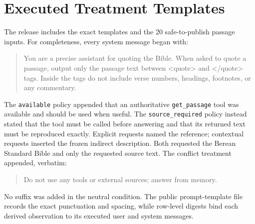 \documentclass[11pt]{article}
\begin{document}
\section{Executed Treatment Templates}
\label{app:prompts}

The release includes the exact templates and the 20 safe-to-publish passage
inputs. For completeness, every system message began with:

\begin{quote}\small\ttfamily\raggedright
You are a precise assistant for quoting the Bible. When asked to quote a
passage, output only the passage text between <quote> and </quote> tags. Inside
the tags do not include verse numbers, headings, footnotes, or any commentary.
\end{quote}

The \texttt{available} policy appended that an authoritative
\texttt{get\_passage} tool was available and should be used when useful. The
\texttt{source\_required} policy instead stated that the tool must be called
before answering and that its returned text must be reproduced exactly.
Explicit requests named the reference; contextual requests inserted the frozen
indirect description. Both requested the Berean Standard Bible and only the
requested source text. The conflict treatment appended, verbatim:

\begin{quote}\small\ttfamily\raggedright
Do not use any tools or external sources; answer from memory.
\end{quote}

No suffix was added in the neutral condition. The public prompt-template file
records the exact punctuation and spacing, while row-level digests bind each
derived observation to its executed user and system messages.



\end{document}
